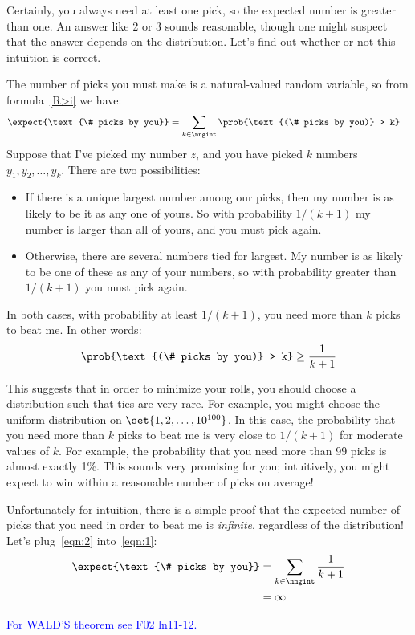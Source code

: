 \begin{editingnotes}
Certainly, you always need at least one pick, so the expected number
is greater than one.  An answer like 2 or 3 sounds reasonable, though
one might suspect that the answer depends on the distribution.  Let's
find out whether or not this intuition is correct.

The number of picks you must make is a natural-valued random variable, so
from formula~\eqref{R>i} we have:
\begin{align}
\expect{\text{\# picks by you}}
    & = \sum_{k \in \nngint} \prob{\text{(\# picks by you)} > k} \label{eqn:1}
\end{align}
Suppose that I've picked my number $z$, and you have picked $k$
numbers $y_1, y_2, \dots, y_k$.  There are two possibilities:
%
\begin{itemize}

\item If there is a unique largest number among our picks, then my
number is as likely to be it as any one of yours.  So with probability
$1/(k+1)$ my number is larger than all of yours, and you must pick
again.

\item Otherwise, there are several numbers tied for largest.  My
number is as likely to be one of these as any of your numbers, so with
probability greater than $1/(k+1)$ you must pick again.

\end{itemize}
%
In both cases, with probability at least $1/(k+1)$, you need more than
$k$ picks to beat me.  In other words:
%
\begin{align}
\prob{\text{(\# picks by you)} > k} \geq \frac{1}{k+1} \label{eqn:2}
\end{align}

This suggests that in order to minimize your rolls, you should choose a
distribution such that ties are very rare.  For example, you might
choose the uniform distribution on $\set{1, 2, \dots, 10^{100}}$.  In
this case, the probability that you need more than $k$ picks to beat
me is very close to $1/(k+1)$ for moderate values of $k$.  For
example, the probability that you need more than 99 picks is almost
exactly 1\%.  This sounds very promising for you; intuitively, you
might expect to win within a reasonable number of picks on average!

Unfortunately for intuition, there is a simple proof that the expected
number of picks that you need in order to beat me is
\emph{infinite}, regardless of the distribution!  Let's
plug~\eqref{eqn:2} into~\eqref{eqn:1}:
%
\begin{align*}
\expect{\text{\# picks by you}}
    & = \sum_{k \in \nngint} \frac{1}{k+1} \\
    & = \infty
\end{align*}

\textcolor{blue}{For WALD'S theorem see F02 ln11-12.}
\end{editingnotes}

